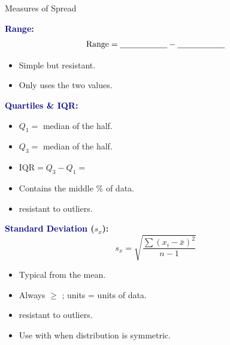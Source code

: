 \documentclass[10pt]{article}
\begin{document}
\begin{notesbox}{Measures of Spread}
\small
\begin{multicols}{2}

\textbf{\textcolor{navy}{Range:}}
\[\text{Range} = \blank{2cm} - \blank{2cm}\]
\begin{itemize}[itemsep=3pt]
  \item Simple but \blank{2cm} resistant.
  \item Only uses the two \blank{2.5cm} values.
\end{itemize}

\vspace{6pt}
\textbf{\textcolor{navy}{Quartiles \& IQR:}}
\begin{itemize}[itemsep=3pt]
  \item $Q_1 = $ median of the \blank{2.5cm} half.
  \item $Q_3 = $ median of the \blank{2.5cm} half.
  \item $\text{IQR} = Q_3 - Q_1 = $ \blank{2cm}
  \item Contains the middle \blank{1cm}\% of data.
  \item \blank{2cm} resistant to outliers.
\end{itemize}

\columnbreak

\textbf{\textcolor{navy}{Standard Deviation} ($s_x$):}
\[s_x = \sqrt{\frac{\sum(x_i - \bar{x})^2}{n-1}}\]
\begin{itemize}[itemsep=3pt]
  \item Typical \blank{2cm} from the mean.
  \item Always $\geq$ \blank{1cm}; units = units of data.
  \item \blank{2cm} resistant to outliers.
  \item Use with \blank{2cm} when distribution is symmetric.
\end{itemize}
\end{multicols}
\end{notesbox}

\vspace{0.08in}
\end{document}
